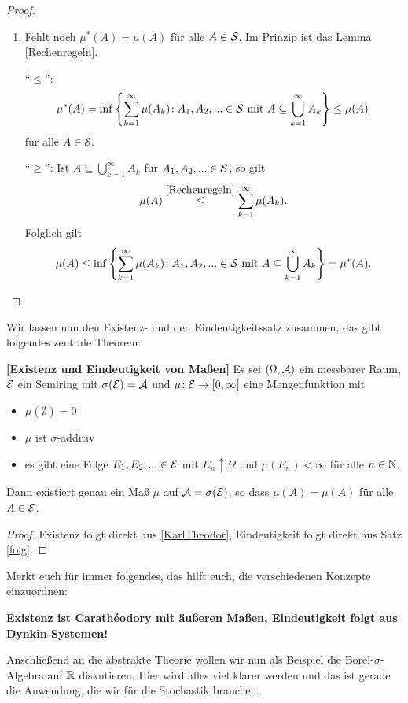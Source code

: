 \begin{proof}
\begin{enumerate}[label=(\alph*)]
		\item Fehlt noch $\mu^{*}(A) = \mu(A)$ für alle $A \in \mathcal{S}$. Im Prinzip ist das Lemma \ref{Rechenregeln}.\smallskip
		
		\enquote{$\leq$}: \[ \mu^{*}(A) = \inf\left\{ \sum\limits_{k=1}^{\infty} \mu(A_k) \! : A_1,A_2,... \in \mathcal{S} \text{ mit } A \subseteq \bigcup\limits_{k = 1}^{\infty} A_k \right\} \leq \mu(A) \:  \]f\"ur alle $A\in \mathcal S$.
		
		\enquote{$\geq$}:  Ist $A \subseteq \bigcup\limits_{k=1}^{\infty} A_k$ f\"ur $A_1,A_2,... \in \mathcal{S}$, 
		so gilt \[ \mu(A) \overset{\ref{Rechenregeln}}{\leq} \sum\limits_{k=1}^{\infty} \mu(A_k). \] Folglich gilt \[ \mu(A) \leq \inf\left\{ \sum\limits_{k=1}^{\infty} \mu(A_k) \! : A_1,A_2,... \in \mathcal{S} \text{ mit } A \subseteq \bigcup\limits_{k = 1}^{\infty} A_k \right\} = \mu^{*}(A). \]		
		
	\end{enumerate}
\end{proof}
Wir fassen nun den Existenz- und den Eindeutigkeitssatz zusammen, das gibt folgendes zentrale Theorem:
\begin{satz}\label{ExistMasse}  \textbf{[Existenz und Eindeutigkeit von Maßen] }
	Es sei $(\Omega, \mathcal{A})$ ein messbarer Raum, $\mathcal{E}$ ein Semiring mit $\sigma(\mathcal{E}) = \mathcal{A}$ und $\mu \! : \mathcal{E} \rightarrow [0,\infty]$ eine Mengenfunktion mit
	\begin{itemize}
		\item $\mu(\emptyset) = 0$
		\item $\mu$ ist $\sigma$-additiv
		\item es gibt eine Folge $E_1,E_2,... \in \mathcal{E}$ mit $E_n \uparrow \Omega$ und $\mu(E_n) < \infty$ f\"ur alle $n\in\mathbb{N}$.
	\end{itemize}
	Dann existiert genau ein Maß $\bar{\mu}$ auf $\mathcal{A} = \sigma(\mathcal{E})$, so dass $\bar{\mu}(A) = \mu(A)$ f\"ur alle $A\in \mathcal{E}$.
\end{satz}

\begin{proof}
	Existenz folgt direkt aus \ref{KarlTheodor}, Eindeutigkeit folgt direkt aus Satz \ref{folg}.
\end{proof}
Merkt euch f\"ur immer folgendes, das hilft euch, die verschiedenen Konzepte einzuordnen:
\begin{center}
	\textbf{Existenz ist Carath\'eodory mit \"au\ss eren Ma\ss en, Eindeutigkeit folgt aus Dynkin-Systemen!}
\end{center}
Anschlie\ss end an die abstrakte Theorie wollen wir nun als Beispiel die Borel-$\sigma$-Algebra auf $\mathbb{R}$ diskutieren. Hier wird alles viel klarer werden und das ist gerade die Anwendung, die wir f\"ur die Stochastik brauchen.



